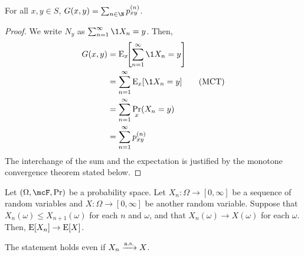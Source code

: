 \begin{lemma} \label{thm:tnr:G}
    For all $x, y \in S$, $G(x, y) = \sum_{n \in \N} p_{xy}^{(n)}$.
\end{lemma}
\begin{proof}
    We write $N_y$ as $\sum_{n=1}^{\infty} \1{X_n = y}$.
    Then, \begin{align*}
        G(x, y) &= \E_x\!\!\left[\sum_{n=1}^{\infty} \1{X_n = y}\right] \\
                &= \sum_{n=1}^{\infty} \E_x[\1{X_n = y}] \tag{MCT} \\
                &= \sum_{n=1}^{\infty} \Pr_x(X_n = y) \\
                &= \sum_{n=1}^{\infty} p_{xy}^{(n)}
    \end{align*}
    The interchange of the sum and the expectation is justified by the
    monotone convergence theorem stated below.
\end{proof}
\begin{theorem} \label{thm:tnr:mct}
    Let $(\Omega, \F, \Pr)$ be a probability space.
    Let $X_n\colon \Omega \to [0, \infty]$ be a sequence of random variables
    and $X\colon \Omega \to [0, \infty]$ be another random variable.
    Suppose that $X_n(\omega)\le X_{n+1}(\omega)$ for each $n$ and $\omega$,
    and that $X_n(\omega) \to X(\omega)$ for each $\omega$.
    Then, $\operatorname{\mathrm{E}}[X_n] \to \operatorname{\mathrm{E}}[X]$.
\end{theorem}
\begin{remark}
    The statement holds even if $X_n \xrightarrow{\text{a.s.}} X$.
\end{remark}

